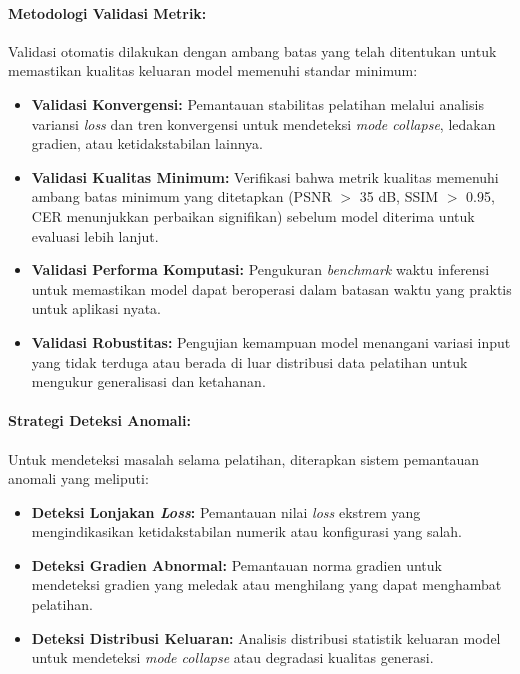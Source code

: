 \documentclass[12pt,a4paper]{article}
\begin{document}
\paragraph{Metodologi Validasi Metrik:}
Validasi otomatis dilakukan dengan ambang batas yang telah ditentukan untuk memastikan kualitas keluaran model memenuhi standar minimum:

\begin{itemize}[leftmargin=*, nosep]
\item \textbf{Validasi Konvergensi:} Pemantauan stabilitas pelatihan melalui analisis variansi \textit{loss} dan tren konvergensi untuk mendeteksi \textit{mode collapse}, ledakan gradien, atau ketidakstabilan lainnya.

\item \textbf{Validasi Kualitas Minimum:} Verifikasi bahwa metrik kualitas memenuhi ambang batas minimum yang ditetapkan (PSNR $>$ 35 dB, SSIM $>$ 0.95, CER menunjukkan perbaikan signifikan) sebelum model diterima untuk evaluasi lebih lanjut.

\item \textbf{Validasi Performa Komputasi:} Pengukuran \textit{benchmark} waktu inferensi untuk memastikan model dapat beroperasi dalam batasan waktu yang praktis untuk aplikasi nyata.

\item \textbf{Validasi Robustitas:} Pengujian kemampuan model menangani variasi input yang tidak terduga atau berada di luar distribusi data pelatihan untuk mengukur generalisasi dan ketahanan.
\end{itemize}

\paragraph{Strategi Deteksi Anomali:}
Untuk mendeteksi masalah selama pelatihan, diterapkan sistem pemantauan anomali yang meliputi:

\begin{itemize}[leftmargin=*, nosep]
\item \textbf{Deteksi Lonjakan \textit{Loss}:} Pemantauan nilai \textit{loss} ekstrem yang mengindikasikan ketidakstabilan numerik atau konfigurasi yang salah.

\item \textbf{Deteksi Gradien Abnormal:} Pemantauan norma gradien untuk mendeteksi gradien yang meledak atau menghilang yang dapat menghambat pelatihan.

\item \textbf{Deteksi Distribusi Keluaran:} Analisis distribusi statistik keluaran model untuk mendeteksi \textit{mode collapse} atau degradasi kualitas generasi.
\end{itemize}
\end{document}
